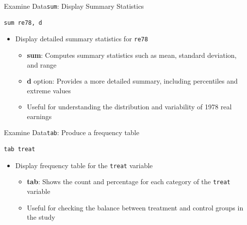 \documentclass[hyperref={pdfpagelabels=false}]{beamer}
\begin{document}
\begin{frame}[fragile]{Examine Data}{\texttt{sum}: Display Summary Statistics}
\begin{lstlisting}
sum re78, d
\end{lstlisting}
\begin{itemize}
	\vspace{0.2cm}
	\item Display detailed summary statistics for \texttt{re78}
	\vspace{0.2cm}
	\begin{itemize}
		\item \textbf{sum}: Computes summary statistics such as mean, standard deviation, and range
		\vspace{0.2cm}
		\item \textbf{d} option: Provides a more detailed summary, including percentiles and extreme values
		\vspace{0.2cm}
		\item Useful for understanding the distribution and variability of 1978 real earnings
	\end{itemize}
\end{itemize}
\end{frame}



\begin{frame}[fragile]{Examine Data}{\texttt{tab}: Produce a frequency table}
\begin{lstlisting}
tab treat
\end{lstlisting}
	\begin{itemize}
		\vspace{0.2cm}
		\item Display frequency table for the \texttt{treat} variable
		\vspace{0.2cm}
		\begin{itemize}
			\item \textbf{tab}: Shows the count and percentage for each category of the \texttt{treat} variable
			\vspace{0.2cm}
			\item Useful for checking the balance between treatment and control groups in the study
		\end{itemize}
	\end{itemize}
	\end{frame}
\end{document}
